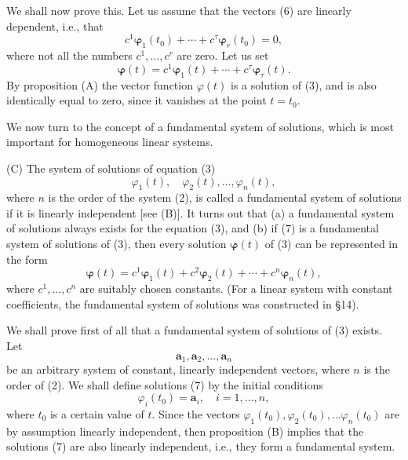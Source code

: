 \documentclass[10pt,a5paper]{book}
\theoremstyle{plain}
\theoremstyle{definition}
\theoremstyle{remark}
\begin{document}
We shall now prove this. Let us assume that the vectors (6) are linearly dependent, i.e., that
\[
c^{1} \boldsymbol{\varphi}_{1}\left(t_{0}\right)+\cdots+c^{\tau} \boldsymbol{\varphi}_{r}\left(t_{0}\right)=0,
\]
where not all the numbers $c^{1}, \ldots, c^{r}$ are zero. Let us set
\[
\boldsymbol{\varphi}(t)=c^{1} \boldsymbol{\varphi}_{1}(t)+\cdots+c^{\tau} \boldsymbol{\varphi}_{\tau}(t) .
\]
By proposition (A) the vector function $\varphi(t)$ is a solution of (3), and is also identically equal to zero, since it vanishes at the point $t=t_{0}$.

We now turn to the concept of a fundamental system of solutions, which is most important for homogeneous linear systems.

(C) The system of solutions of equation (3)
\begin{equation*}
\varphi_{1}(t), \quad \varphi_{2}(t), \ldots, \varphi_{n}(t), \tag{7}
\end{equation*}
where $n$ is the order of the system (2), is called a fundamental system of solutions if it is linearly independent [see (B)]. It turns out that (a) a fundamental system of solutions always exists for the equation (3), and (b) if (7) is a fundamental system of solutions of (3), then every solution $\boldsymbol{\varphi}(t)$ of (3) can be represented in the form
\begin{equation*}
\boldsymbol{\varphi}(t)=c^{1} \boldsymbol{\varphi}_{1}(t)+c^{2} \boldsymbol{\varphi}_{2}(t)+\cdots+c^{n} \boldsymbol{\varphi}_{n}(t), \tag{8}
\end{equation*}
where $c^{1}, \ldots, c^{n}$ are suitably chosen constants. (For a linear system with constant coefficients, the fundamental system of solutions was constructed in §14).

We shall prove first of all that a fundamental system of solutions of (3) exists. Let
\[
\mathbf{a}_{1}, \mathbf{a}_{2}, \ldots, \mathbf{a}_{n}
\]
be an arbitrary system of constant, linearly independent vectors, where $n$ is the order of (2). We shall define solutions (7) by the initial conditions
\[
\varphi_{i}\left(t_{0}\right)=\mathbf{a}_{i}, \quad i=1, \ldots, n,
\]
where $t_{0}$ is a certain value of $t$. Since the vectors $\varphi_{1}\left(t_{0}\right), \varphi_{2}\left(t_{0}\right), \ldots \varphi_{n}\left(t_{0}\right)$ are by assumption linearly independent, then proposition (B) implies that the solutions (7) are also linearly independent, i.e., they form a fundamental system.
\end{document}
